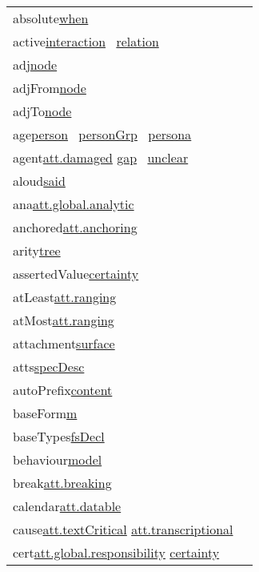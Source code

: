 \begin{longtable}{L{.2\textwidth}P{.8\textwidth}}
absolute\tabcellsep \hyperref[TEI.when]{when} \\
active\tabcellsep \hyperref[TEI.interaction]{interaction}  \hyperref[TEI.relation]{relation} \\
adj\tabcellsep \hyperref[TEI.node]{node} \\
adjFrom\tabcellsep \hyperref[TEI.node]{node} \\
adjTo\tabcellsep \hyperref[TEI.node]{node} \\
age\tabcellsep \hyperref[TEI.person]{person}  \hyperref[TEI.personGrp]{personGrp}  \hyperref[TEI.persona]{persona} \\
agent\tabcellsep \hyperref[TEI.att.damaged]{att.damaged} \hyperref[TEI.gap]{gap}  \hyperref[TEI.unclear]{unclear} \\
aloud\tabcellsep \hyperref[TEI.said]{said} \\
ana\tabcellsep \hyperref[TEI.att.global.analytic]{att.global.analytic}\\
anchored\tabcellsep \hyperref[TEI.att.anchoring]{att.anchoring}\\
arity\tabcellsep \hyperref[TEI.tree]{tree} \\
assertedValue\tabcellsep \hyperref[TEI.certainty]{certainty} \\
atLeast\tabcellsep \hyperref[TEI.att.ranging]{att.ranging}\\
atMost\tabcellsep \hyperref[TEI.att.ranging]{att.ranging}\\
attachment\tabcellsep \hyperref[TEI.surface]{surface} \\
atts\tabcellsep \hyperref[TEI.specDesc]{specDesc} \\
autoPrefix\tabcellsep \hyperref[TEI.content]{content} \\
baseForm\tabcellsep \hyperref[TEI.m]{m} \\
baseTypes\tabcellsep \hyperref[TEI.fsDecl]{fsDecl} \\
behaviour\tabcellsep \hyperref[TEI.model]{model} \\
break\tabcellsep \hyperref[TEI.att.breaking]{att.breaking}\\
calendar\tabcellsep \hyperref[TEI.att.datable]{att.datable}\\
cause\tabcellsep \hyperref[TEI.att.textCritical]{att.textCritical} \hyperref[TEI.att.transcriptional]{att.transcriptional}\\
cert\tabcellsep \hyperref[TEI.att.global.responsibility]{att.global.responsibility} \hyperref[TEI.certainty]{certainty} \\

\end{longtable}
